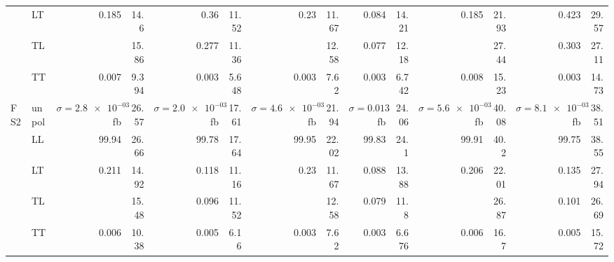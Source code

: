 \begin{table}[h]
{\begin{tabular}{llrrrrrrrrrrrr}
 & LT & \num{0.185} & \num{14.6} & \num{0.36} & \num{11.52} & \num{0.23} & \num{11.67} & \num{0.084} & \num{14.21} & \num{0.185} & \num{21.93} & \num{0.423} & \num{29.57} \\
 & TL &  & \num{15.86} & \num{0.277} & \num{11.36} &  & \num{12.58} & \num{0.077} & \num{12.18} &  & \num{27.44} & \num{0.303} & \num{27.11} \\
 & TT & \num{0.007} & \num{9.394} & \num{0.003} & \num{5.648} & \num{0.003} & \num{7.62} & \num{0.003} & \num{6.742} & \num{0.008} & \num{15.23} & \num{0.003} & \num{14.73} \\
\midrule
\multirow{5}{*}{FS2}
 & unpol & $\sigma = \num{2.8e-03}$ fb & \num{26.57} & $\sigma = \num{2.0e-03}$ fb & \num{17.61} & $\sigma = \num{4.6e-03}$ fb & \num{21.94} & $\sigma = \num{0.013}$ fb & \num{24.06} & $\sigma = \num{5.6e-03}$ fb & \num{40.08} & $\sigma = \num{8.1e-03}$ fb & \num{38.51} \\
 & LL & \num{99.94} & \num{26.66} & \num{99.78} & \num{17.64} & \num{99.95} & \num{22.02} & \num{99.83} & \num{24.1} & \num{99.91} & \num{40.2} & \num{99.75} & \num{38.55} \\
 & LT & \num{0.211} & \num{14.92} & \num{0.118} & \num{11.16} & \num{0.23} & \num{11.67} & \num{0.088} & \num{13.88} & \num{0.206} & \num{22.01} & \num{0.135} & \num{27.94} \\
 & TL &  & \num{15.48} & \num{0.096} & \num{11.52} &  & \num{12.58} & \num{0.079} & \num{11.8} &  & \num{26.87} & \num{0.101} & \num{26.69} \\
 & TT & \num{0.006} & \num{10.38} & \num{0.005} & \num{6.16} & \num{0.003} & \num{7.62} & \num{0.003} & \num{6.676} & \num{0.006} & \num{16.7} & \num{0.005} & \num{15.72} \\
\bottomrule
\end{tabular}
}%
\end{table}
\newpage
